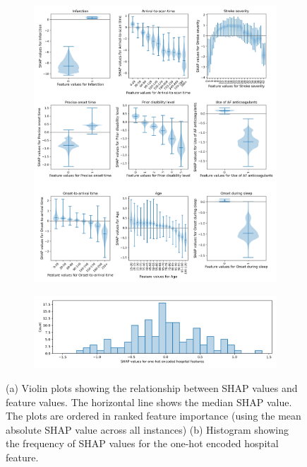 \begin{figure}[!h]
\centering
\begin{subfigure}{.9\textwidth}
  \centering
    \includegraphics[width=1.\textwidth]{./images/03d_xgb_10_features_thrombolysis_shap_violin_all_features}
    \caption{}
  \label{fig:shap_feature_subfigure_a}
\end{subfigure}
\begin{subfigure}{.9\textwidth}
  \centering
    \includegraphics[width=1.\textwidth]{./images/03d_xgb_10_features_hosp_shap_hist}
    \caption{}
  \label{fig:shap_feature_subfigure_b}
\end{subfigure}
\caption{(a) Violin plots showing the relationship between SHAP values and feature values. The horizontal line shows the median SHAP value. The plots are ordered in ranked feature importance (using the mean absolute SHAP value across all instances) (b) Histogram showing the frequency of SHAP values for the one-hot encoded hospital feature.}
\end{figure}


